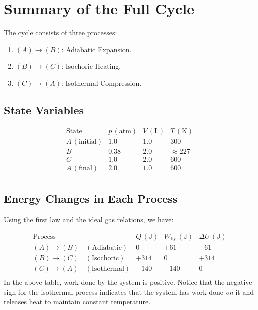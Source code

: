 \documentclass[12pt]{article}
\theoremstyle{definition} %
\theoremstyle{plain} %
\begin{document}
\section*{Summary of the Full Cycle}

The cycle consists of three processes:
\begin{enumerate}
    \item \((A)\to(B)\): Adiabatic Expansion.
    \item \((B)\to(C)\): Isochoric Heating.
    \item \((C)\to(A)\): Isothermal Compression.
\end{enumerate}

\subsection*{State Variables}

\[
\begin{array}{cccc}

\text{State} & p\,(\mathrm{atm}) & V\,(\mathrm{L}) & T\,(\mathrm{K}) \\

A\,(\text{initial}) & 1.0 & 1.0 & 300 \\
B                  & 0.38 & 2.0 & \approx227 \\
C                  & 1.0  & 2.0 & 600 \\
A\,(\text{final})  & 2.0  & 1.0 & 600 \\

\end{array}
\]

\subsection*{Energy Changes in Each Process}

Using the first law and the ideal gas relations, we have:

\[
\begin{array}{lccc}

\text{Process} & Q\,(\mathrm{J}) & W_{\text{by}}\,(\mathrm{J}) & \Delta U\,(\mathrm{J}) \\
(A)\to(B) \quad (\text{Adiabatic}) & 0      & +61   & -61 \\
(B)\to(C) \quad (\text{Isochoric})  & +314   & 0     & +314 \\
(C)\to(A) \quad (\text{Isothermal}) & -140   & -140  & 0 \\
\end{array}
\]
In the above table, work done by the system is positive. Notice that the negative sign for the isothermal process indicates that the system has work done \emph{on} it and releases heat to maintain constant temperature.
\end{document}
